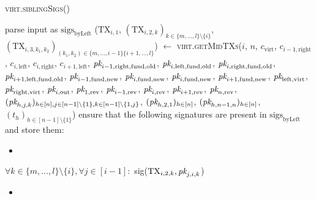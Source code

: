 \begin{center}
  \begin{processbox}{\textsc{virt.siblingSigs}()}
    \begin{algorithmic}[1]
      \State parse input as $\mathrm{sigs}_{\mathrm{byLeft}}$
      \State ($\mathrm{TX}_{i, 1}$, $(\mathrm{TX}_{i, 2, k})_{k \in \{m, \dots,
      l\} \setminus \{i\}}$, $(\mathrm{TX}_{i, 3, k_1, k_2})_{(k_1, k_2) \in
      \{m, \dots, i-1\} \{i+1, \dots, l\}}$) $\gets$
      \textsc{virt.getMidTXs}($i$, $n$, $c_{\mathrm{virt}}$, $c_{i-1,
      \mathrm{right}}$, $c_{i, \mathrm{left}}$, $c_{i, \mathrm{right}}$,
      $c_{i+1, \mathrm{left}}$, $\textit{pk}_{i-1, \mathrm{right}, \mathrm{fund},
      \mathrm{old}}$, $\textit{pk}_{i, \mathrm{left}, \mathrm{fund}, \mathrm{old}}$,
      $\textit{pk}_{i, \mathrm{right}, \mathrm{fund}, \mathrm{old}}$, $\textit{pk}_{i+1,
      \mathrm{left}, \mathrm{fund}, \mathrm{old}}$, $\textit{pk}_{i-1, \mathrm{fund},
      \mathrm{new}}$, $\textit{pk}_{i, \mathrm{fund}, \mathrm{new}}$, $\textit{pk}_{i,
      \mathrm{fund}, \mathrm{new}}$, $\textit{pk}_{i+1, \mathrm{fund}, \mathrm{new}}$,
      $\textit{pk}_{\mathrm{left}, \mathrm{virt}}$, $\textit{pk}_{\mathrm{right}, \mathrm{virt}}$,
      $\textit{pk}_{i, \mathrm{out}}$, $\textit{pk}_{1, \mathrm{rev}}$, $\textit{pk}_{i-1, \mathrm{rev}}$,
      $\textit{pk}_{i, \mathrm{rev}}$, $\textit{pk}_{i+1, \mathrm{rev}}$, $\textit{pk}_{n, \mathrm{rev}}$,
      $(\textit{pk}_{h,j,k})_{h \in [n], j \in [n-1] \setminus \{1\}, k \in [n-1]
      \setminus \{1, j\}}$, $(\textit{pk}_{h, 2, 1})_{h \in [n]}$, $(\textit{pk}_{h, n-1, n})_{h
      \in [n]}$, $(t_h)_{h \in [n-1] \setminus \{1\}}$)
      \Statex
      \State {}
      \State ensure that the following signatures are present in
      $\mathrm{sigs}_{\mathrm{byLeft}}$ and store them:
      \begin{itemize}
        \item {}
      \end{itemize}
      \Indent
        \State $\forall k \in \{m, \dots, l\} \setminus \{i\}, \forall j \in
        [i-1]:$
        \Indent
          \State sig($\mathrm{TX}_{i, 2, k}, \textit{pk}_{j, i, k}$)
        \EndIndent
      \EndIndent
      \begin{itemize}
        \item {}
      \end{itemize}

\end{algorithmic}
\end{processbox}
\end{center}
